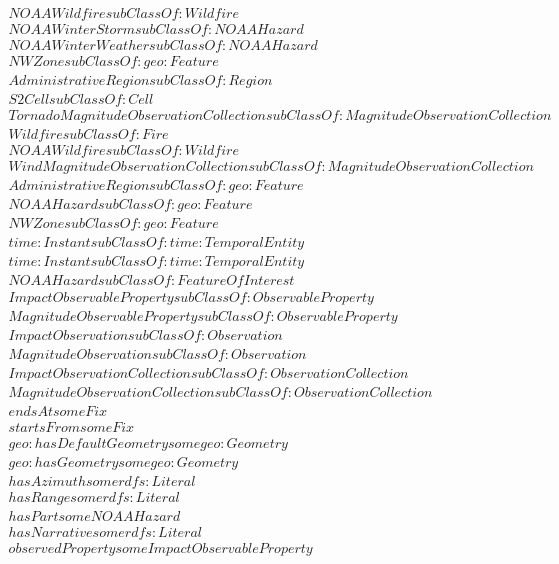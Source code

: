 \begin{align}
  NOAAWildfire subClassOf: Wildfire\\
  NOAAWinterStorm subClassOf: NOAAHazard\\
  NOAAWinterWeather subClassOf: NOAAHazard\\
  NWZone subClassOf: geo:Feature\\
  AdministrativeRegion subClassOf: Region\\
  S2Cell subClassOf: Cell\\
  TornadoMagnitudeObservationCollection subClassOf: MagnitudeObservationCollection\\
  Wildfire subClassOf: Fire\\
  NOAAWildfire subClassOf: Wildfire\\
  WindMagnitudeObservationCollection subClassOf: MagnitudeObservationCollection\\
  AdministrativeRegion subClassOf: geo:Feature\\
  NOAAHazard subClassOf: geo:Feature\\
  NWZone subClassOf: geo:Feature\\
  time:Instant subClassOf: time:TemporalEntity\\
  time:Instant subClassOf: time:TemporalEntity\\
  NOAAHazard subClassOf: FeatureOfInterest\\
  ImpactObservableProperty subClassOf: ObservableProperty\\
  MagnitudeObservableProperty subClassOf: ObservableProperty\\
  ImpactObservation subClassOf: Observation\\
  MagnitudeObservation subClassOf: Observation\\
  ImpactObservationCollection subClassOf: ObservationCollection\\
  MagnitudeObservationCollection subClassOf: ObservationCollection\\
  endsAt some Fix \\
  startsFrom some Fix \\
  geo:hasDefaultGeometry some geo:Geometry \\
  geo:hasGeometry some geo:Geometry \\
  hasAzimuth some rdfs:Literal \\
  hasRange some rdfs:Literal \\
  hasPart some NOAAHazard \\
  hasNarrative some rdfs:Literal \\
  observedProperty some ImpactObservableProperty \\

\end{align}
